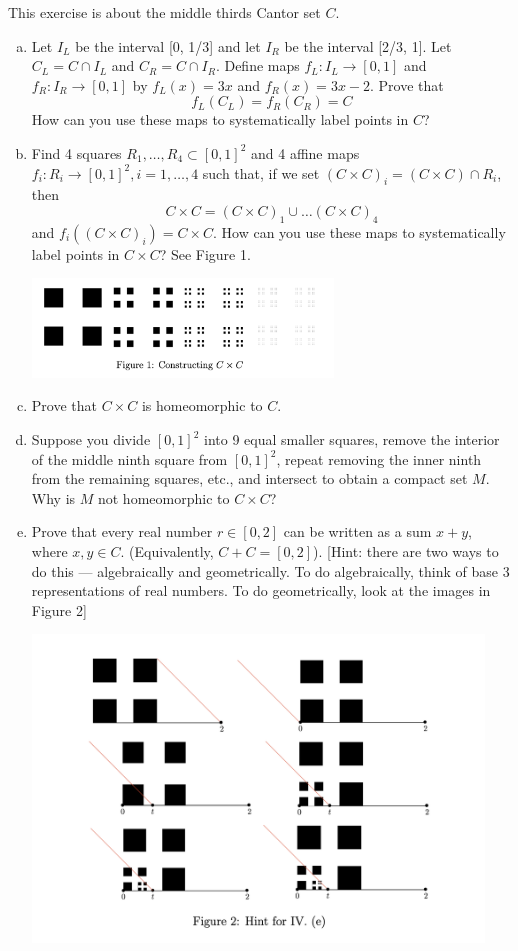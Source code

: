\documentclass[a4paper, 12pt]{article}
\begin{document}
\begin{problem} [IV]
This exercise is about the middle thirds Cantor set $C$.
\begin{enumerate} [(a)]
    \item Let $I_L$ be the interval [0, 1/3] and let $I_R$ be the interval [2/3, 1]. Let $C_L = C \cap I_L$ and $C_R = C \cap I_R$. Define maps $f_L: I_L \to [0, 1]$ and $f_R: I_R \to [0, 1]$ by $f_L(x) = 3x$ and $f_R(x) = 3x-2$. Prove that \[
              f_L(C_L) = f_R(C_R) = C
          \]
          How can you use these maps to systematically label points in $C$?

    \item Find 4 squares $R_1, \dots, R_4 \subset [0, 1]^2$ and 4 affine maps $f_i: R_i \to [0, 1]^2, i = 1, \dots, 4$ such that, if we set $(C \times C)_i = (C \times C) \cap R_i$, then \[
              C \times C = (C \times C)_1 \cup \dots (C \times C)_4
          \]
          and $f_i((C\times C)_i) = C \times C$. How can you use these maps to systematically label points in $C \times C$? See Figure 1.
          \begin{center}
              \includegraphics[width = 8cm]{./figures/cantorfigure1.png}
          \end{center}
    \item Prove that $C \times C$ is homeomorphic to $C$.
    \item Suppose you divide $[0, 1]^2$ into 9 equal smaller squares, remove the interior of the middle ninth square from $[0, 1]^2$, repeat removing the inner ninth from the remaining squares, etc., and intersect to obtain a compact set $M$. Why is $M$ not homeomorphic to $C \times C$?
    \item Prove that every real number $r \in [0, 2]$ can be written as a sum $x +y$, where $x, y \in C$. (Equivalently, $C + C = [0, 2]$). [Hint: there are two ways to do this — algebraically and geometrically. To do algebraically, think of base 3 representations of real numbers. To do geometrically, look at the images in Figure 2]
          \begin{center}
              \includegraphics[width = 12cm]{./figures/cantorfigure2.png}

\end{center}
\end{enumerate}
\end{problem}
\end{document}
